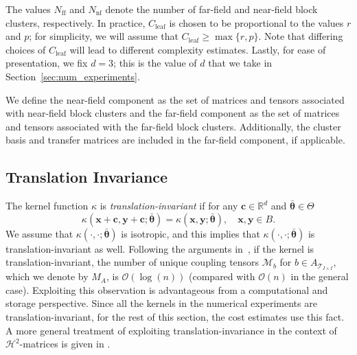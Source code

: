 \documentclass[final,3p,times]{elsarticle}
\newcommand{\mc}[1]{\mathcal{#1}}
\renewcommand{\vec}[1]{\boldsymbol{#1}}
\newcommand{\ten}[1]{\boldsymbol{\mathcal{#1}}}
\begin{document}
The values $N_{\text{ff}}$ and $N_{\text{nf}}$ denote the number of far-field and near-field block clusters, respectively. In practice, $C_{\text{leaf}}$ is chosen to be proportional to the values $r$ and $p$; for simplicity, we  will assume that $C_{\text{leaf}} \ge \max\{r, p\}$. Note that differing choices of $C_{\text{leaf}}$ will lead to different complexity estimates. Lastly, for ease of presentation, we fix $d = 3$; this is the value of $d$ that we take in Section~\ref{sec:num_experiments}.


We define the near-field component as the set of matrices and tensors associated with near-field block clusters and the far-field component as the set of matrices and tensors associated with the far-field block clusters. Additionally, the cluster basis and transfer matrices are  included in the far-field component, if applicable.  

\subsection{Translation Invariance}\label{ssec:translation_invariance}
  The kernel function $\kappa$ is \emph{translation-invariant} if for any $\vec{c} \in \mathbb{R}^{d}$ and $\bar{\vec{\theta}} \in \Theta$ 
\begin{equation*}
    \kappa(\vec{x} + \vec{c}, \vec{y} + \vec{c}; \bar{\vec{\theta}}) 
    = \kappa(\vec{x}, \vec{y}; \bar{\vec{\theta}}), 
    \quad \vec{x}, \vec{y} \in B.
\end{equation*}
We assume that $\kappa(\cdot,\cdot;\bar{\vec\theta})$ is isotropic, and this implies that $\kappa(\cdot,\cdot;\bar{\vec\theta})$ is translation-invariant as well. Following the arguments in~\cite{fong2009black}, if the kernel is translation-invariant, the number of unique  coupling tensors $\ten{M}_b$ for $b \in A_{\mc{T}_{I\times I}}$, which we denote by $M_A$, is $\mc{O}(\log(n))$ (compared with $\mc{O}(n)$ in the general case). 
Exploiting this observation is advantageous from a computational and storage perspective. Since all the kernels in the numerical experiments are translation-invariant, for the rest of this section, the cost estimates use this fact. A more general treatment of exploiting translation-invariance in the context of $\mc{H}^{2}$-matrices is given in \cite{BORM2025106190}.
\end{document}
